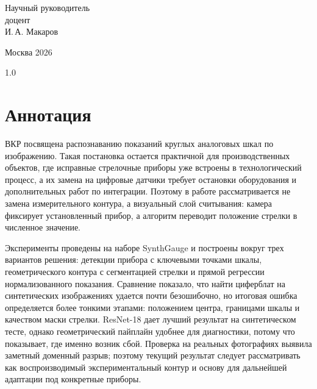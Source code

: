 \documentclass[a4paper,14pt]{extarticle}
\begin{document}
\begin{titlepage}
{			\vspace{1.0cm}

			\noindent
			\hfill
			\begin{minipage}[t]{0.58\textwidth}
				\raggedleft
				Научный руководитель\\
				доцент\\
				И.\,А. Макаров
			\end{minipage}

			\vfill

			\begin{center}
				Москва 2026
			\end{center}
		}

	\end{titlepage}

		\setcounter{page}{2}

		\hypersetup{linkcolor=black}
		\begin{spacing}{1.0}
		\tableofcontents
		\end{spacing}
		\hypersetup{linkcolor=blue}

	\newpage

\section*{Аннотация}
\begingroup
\fontsize{13.4}{16}\selectfont
ВКР посвящена распознаванию показаний круглых аналоговых шкал по изображению. Такая постановка остается практичной для производственных объектов, где исправные стрелочные приборы уже встроены в технологический процесс, а их замена на цифровые датчики требует остановки оборудования и дополнительных работ по интеграции. Поэтому в работе рассматривается не замена измерительного контура, а визуальный слой считывания: камера фиксирует установленный прибор, а алгоритм переводит положение стрелки в численное значение.

Эксперименты проведены на наборе SynthGauge и построены вокруг трех вариантов решения: детекции прибора с ключевыми точками шкалы, геометрического контура с сегментацией стрелки и прямой регрессии нормализованного показания. Сравнение показало, что найти циферблат на синтетических изображениях удается почти безошибочно, но итоговая ошибка определяется более тонкими этапами: положением центра, границами шкалы и качеством маски стрелки. ResNet-18 дает лучший результат на синтетическом тесте, однако геометрический пайплайн удобнее для диагностики, потому что показывает, где именно возник сбой. Проверка на реальных фотографиях выявила заметный доменный разрыв; поэтому текущий результат следует рассматривать как воспроизводимый экспериментальный контур и основу для дальнейшей адаптации под конкретные приборы.
\endgroup
\end{document}
